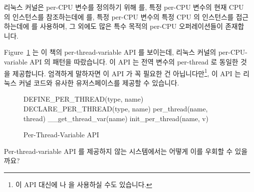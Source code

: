 리눅스 커널은 per-CPU 변수를 정의하기 위해  를, 특정
per-CPU 변수의 현재 CPU 의 인스턴스를 참조하는데에  를, 특정
per-CPU 변수의 특정 CPU 의 인스턴스를 접근하는데에  를 사용하며,
그 외에도 많은 특수 목적의 per-CPU 오퍼레이션들이 존재합니다.

Figure~\ref{fig:toolsoftrade:Per-Thread-Variable API}
는 이 책의 per-thread-variable API 를 보이는데, 리눅스 커널의 per-CPU-variable
API 의 패턴을 따랐습니다.
이 API 는 전역 변수의 per-thread 로 동일한 것을 제공합니다.
엄격하게 말하자면 이 API 가 꼭 필요한 건 아닙니다만\footnote{
	이 API 대신에  나  을 사용하실 수도
	있습니다.},
이 API 는 리눅스 커널 코드와 유사한 유저스페이스를 제공할 수 있습니다.

\begin{figure}[htbp]
{ \scriptsize
\begin{verbbox}
DEFINE_PER_THREAD(type, name)
DECLARE_PER_THREAD(type, name)
per_thread(name, thread)
__get_thread_var(name)
init_per_thread(name, v)
\end{verbbox}
}
\centering
\theverbbox
\caption{Per-Thread-Variable API}
\label{fig:toolsoftrade:Per-Thread-Variable API}
\end{figure}

\QuickQuiz{}
	Per-thread-variable API 를 제공하지 않는 시스템에서는 어떻게 이를
	우회할 수 있을까요?
	\iffalse

